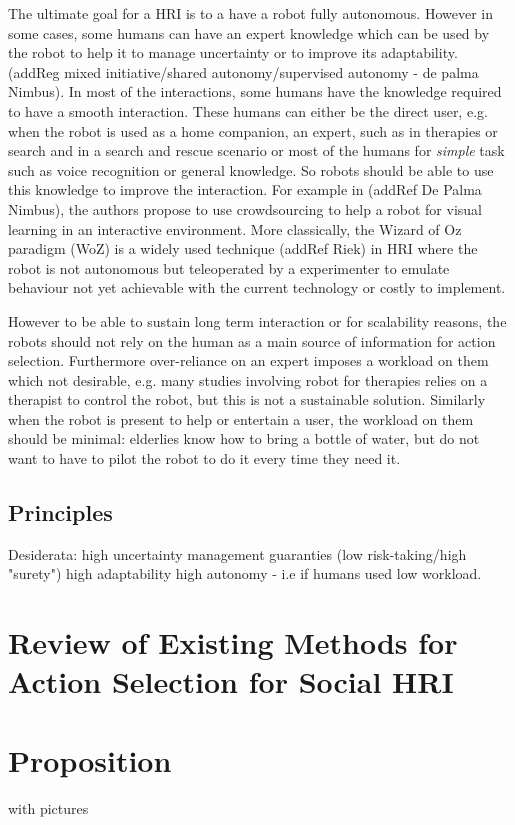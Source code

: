 
	
	The ultimate goal for a HRI is to a have a robot fully autonomous. However in some cases, some humans can have an expert knowledge which can be used by the robot to help it to manage uncertainty or to improve its adaptability. (addReg mixed initiative/shared autonomy/supervised autonomy - de palma Nimbus).				
	In most of the interactions, some humans have the knowledge required to have a smooth interaction. These humans can either be the direct user, e.g. when the robot is used as a home companion, an expert, such as in therapies or search and in a search and rescue scenario or most of the humans for \emph{simple} task such as voice recognition or general knowledge. So robots should be able to use this knowledge to improve the interaction. For example in (addRef De Palma Nimbus), the authors propose to use crowdsourcing to help a robot for visual learning in an interactive environment. More classically, the Wizard of Oz paradigm (WoZ) is a widely	 used technique (addRef Riek) in HRI where the robot is not autonomous but teleoperated by a experimenter to emulate behaviour not yet achievable with the current technology or costly to implement. 
	
	However to be able to sustain long term interaction or for scalability reasons, the robots should not rely on the human as a main source of information for action selection. Furthermore over-reliance on an expert imposes a workload on them which not desirable, e.g. many studies involving robot for therapies relies on a therapist to control the robot, but this is not a sustainable solution. Similarly when the robot is present to help or entertain a user, the workload on them should be minimal: elderlies know how to bring a bottle of water, but do not want to have to pilot the robot to do it every time they need it.
\subsection{Principles}
	Desiderata: 
	high uncertainty management guaranties (low risk-taking/high "surety")
	high adaptability
	high autonomy - i.e if humans used low workload.	
		
		
\section{Review of Existing Methods for Action Selection for Social HRI}

\section{Proposition}


with pictures
